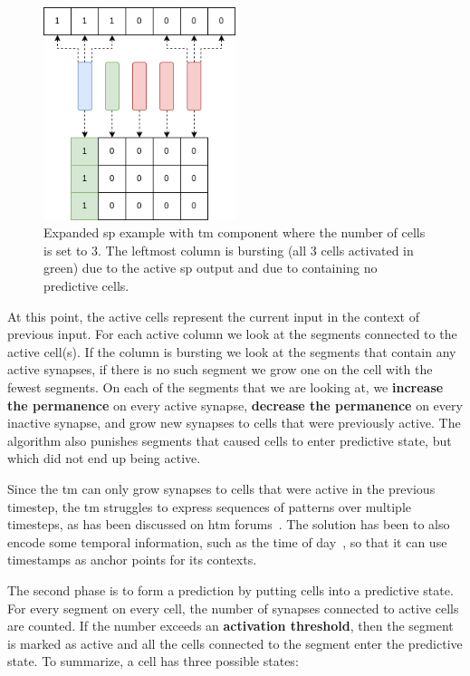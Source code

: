 \par
\begin{figure}[htb]
    \centering
    \includegraphics[width=0.5\textwidth]{resources/related_works/tm_vis1.png}
    \caption[Temporal Memory Workings]{Expanded \gls*{sp} example with \gls*{tm} component where the number of cells is set to 3. The leftmost column is bursting (all 3 cells activated in green) due to the active \gls*{sp} output and due to containing no predictive cells.}
    \label{fig:tm_vis1}
\end{figure}
\par
At this point, the active cells represent the current input in the context of previous input. For each active column we look at the segments connected to the active cell(s). If the column is bursting we look at the segments that contain any active synapses, if there is no such segment we grow one on the cell with the fewest segments. On each of the segments that we are looking at, we \textbf{increase the permanence} on every active synapse, \textbf{decrease the permanence} on every inactive synapse, and grow new synapses to cells that were previously active. The algorithm also punishes segments that caused cells to enter predictive state, but which did not end up being active.
\par
Since the \gls*{tm} can only grow synapses to cells that were active in the previous timestep, the \gls*{tm} struggles to express sequences of patterns over multiple timesteps, as has been discussed on \gls*{htm} forums~\cite{tm_sequence_problem}. The solution has been to also encode some temporal information, such as the time of day~\cite{AHMAD2017134,tm_sequence_problem}, so that it can use timestamps as anchor points for its contexts.
\par
The second phase is to form a prediction by putting cells into a predictive state. For every segment on every cell, the number of synapses connected to active cells are counted. If the number exceeds an \textbf{activation threshold}, then the segment is marked as active and all the cells connected to the segment enter the predictive state. To summarize, a cell has three possible states:

